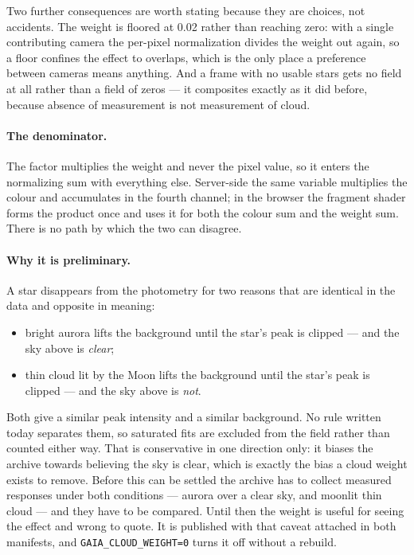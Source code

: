 \documentclass[11pt,a4paper]{article}
\begin{document}
Two further consequences are worth stating because they are choices, not accidents. The
weight is floored at \num{0.02} rather than reaching zero: with a single
contributing camera the per-pixel normalization divides the weight out again, so
a floor confines the effect to overlaps, which is the only place a preference
between cameras means anything. And a frame with no usable stars gets no field
at all rather than a field of zeros --- it composites exactly as it did before,
because absence of measurement is not measurement of cloud.

\paragraph{The denominator.} The factor multiplies the weight and never the
pixel value, so it enters the normalizing sum with everything else. Server-side
the same variable multiplies the colour and accumulates in the fourth channel;
in the browser the fragment shader forms the product once and uses it for both
the colour sum and the weight sum. There is no path by which the two can
disagree.

\paragraph{Why it is preliminary.} A star disappears from the photometry for
two reasons that are identical in the data and opposite in meaning:

\begin{itemize}
  \item bright aurora lifts the background until the star's peak is clipped ---
    and the sky above is \emph{clear};
  \item thin cloud lit by the Moon lifts the background until the star's peak is
    clipped --- and the sky above is \emph{not}.
\end{itemize}

Both give a similar peak intensity and a similar background. No rule written
today separates them, so saturated fits are excluded from the field rather than
counted either way. That is conservative in one direction only: it biases the
archive towards believing the sky is clear, which is exactly the bias a cloud
weight exists to remove. Before this can be settled the archive has to collect
measured responses under both conditions --- aurora over a clear sky, and
moonlit thin cloud --- and they have to be compared. Until then the weight is
useful for seeing the effect and wrong to quote. It is published with that
caveat attached in both manifests, and \texttt{GAIA\_CLOUD\_WEIGHT=0} turns it
off without a rebuild.
\end{document}
